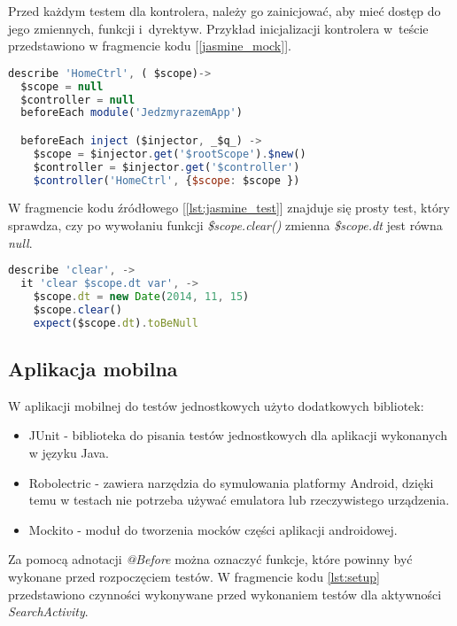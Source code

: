 \documentclass[eng,archivemode]{mgr}
\begin{document}
Przed każdym testem dla kontrolera, należy go zainicjować, aby mieć dostęp do jego zmiennych, funkcji i~dyrektyw. Przykład inicjalizacji kontrolera w~teście przedstawiono w fragmencie kodu [\ref{jasmine_mock}].
\newpage
\begin{lstlisting}[language=javascript, caption={Inicjalizacja testów aplikacji internetowej}, label=jasmine_mock ]
describe 'HomeCtrl', ( $scope)->
  $scope = null
  $controller = null
  beforeEach module('JedzmyrazemApp')

  beforeEach inject ($injector, _$q_) ->
    $scope = $injector.get('$rootScope').$new()
    $controller = $injector.get('$controller')
    $controller('HomeCtrl', {$scope: $scope })
\end{lstlisting}
W fragmencie kodu źródłowego [\ref{lst:jasmine_test}] znajduje się prosty test, który sprawdza, czy po wywołaniu funkcji \textit{\$scope.clear()} zmienna \textit{\$scope.dt} jest równa \textit{null}.
\begin{lstlisting}[language=javascript, caption={Test jednostkowy dla metody z~aplikacji internetowej}, label=lst:jasmine_test]
describe 'clear', ->
  it 'clear $scope.dt var', ->
    $scope.dt = new Date(2014, 11, 15)
    $scope.clear()
    expect($scope.dt).toBeNull
\end{lstlisting}

\subsection{Aplikacja mobilna}

W aplikacji mobilnej do testów jednostkowych użyto dodatkowych bibliotek:
\begin{itemize}
	\item JUnit - biblioteka do pisania testów jednostkowych dla aplikacji wykonanych w języku Java.
	\item Robolectric - zawiera narzędzia do symulowania platformy Android, dzięki temu w testach nie potrzeba używać emulatora lub rzeczywistego urządzenia.
	\item Mockito - moduł do tworzenia mocków części aplikacji androidowej.
\end{itemize}

Za pomocą adnotacji \textit{@Before} można oznaczyć funkcje, które powinny być wykonane przed rozpoczęciem testów. W fragmencie kodu \ref{lst:setup} przedstawiono czynności wykonywane przed wykonaniem testów dla aktywności \textit{SearchActivity}.
\end{document}
